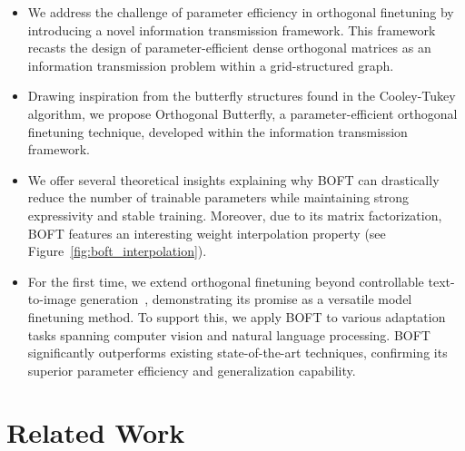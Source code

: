 \begin{itemize}[leftmargin=*,nosep]
    \item We address the challenge of parameter efficiency in orthogonal finetuning by introducing a novel information transmission framework. This framework recasts the design of parameter-efficient dense orthogonal matrices as an information transmission problem within a grid-structured graph.
    \item Drawing inspiration from the butterfly structures found in the Cooley-Tukey algorithm, we propose Orthogonal Butterfly, a parameter-efficient orthogonal finetuning technique, developed within the information transmission framework.
    \item We offer several theoretical insights explaining why BOFT can drastically reduce the number of trainable parameters while maintaining strong expressivity and stable training. Moreover, due to its matrix factorization, BOFT features an interesting weight interpolation property (see Figure~\ref{fig:boft_interpolation}).
    \item For the first time, we extend orthogonal finetuning beyond controllable text-to-image generation~\cite{qiu2023controlling}, demonstrating its promise as a versatile model finetuning method. To support this, we apply BOFT to various adaptation tasks spanning computer vision and natural language processing. BOFT significantly outperforms existing state-of-the-art techniques, confirming its superior parameter efficiency and generalization capability.
\end{itemize}

\section{Related Work}

